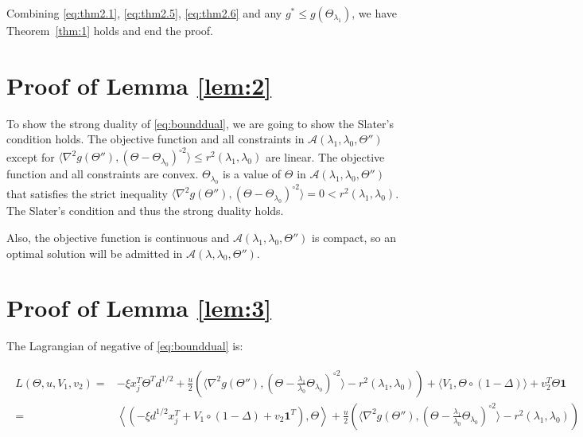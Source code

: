 Combining \eqref{eq:thm2.1}, \eqref{eq:thm2.5}, \eqref{eq:thm2.6} and any $g^*\leq g(\Theta_{\lambda_1})$, we have Theorem~\ref{thm:1} holds and end the proof.

\hspace{0 in}

\section{Proof of Lemma \ref{lem:2}}

To show the strong duality of \eqref{eq:bounddual}, we are going to show the Slater's condition holds. The objective function and all constraints in $\mathcal{A}(\lambda_1,{\lambda_0},\Theta'')$ except for $\langle\nabla^2 g(\Theta''),(\Theta-\Theta_{\lambda_0})^{\circ 2}\rangle\leq r^2(\lambda_1,\lambda_0)$ are linear. The objective function and all constraints are convex. $\Theta_{\lambda_0}$ is a value of $\Theta$ in $\mathcal{A}(\lambda_1,{\lambda_0},\Theta'')$ that satisfies the strict inequality $\langle\nabla^2 g(\Theta''),(\Theta-\Theta_{\lambda_0})^{\circ 2}\rangle=0< r^2(\lambda_1,\lambda_0)$. The Slater's condition and thus the strong duality holds.

Also, the objective function is continuous and $\mathcal{A}(\lambda_1,{\lambda_0},\Theta'')$ is compact, so an optimal solution will be admitted in $\mathcal{A}(\lambda,{\lambda_0},\Theta'')$.


\section{Proof of Lemma \ref{lem:3}}

The Lagrangian of negative of \eqref{eq:bounddual} is:

\begin{gather}
    \label{eq:lem4.1}
    \begin{aligned}
        L(\Theta,u,V_1,v_2)=&-\xi x_j^T\Theta^T d^{1/2}+\frac{u}{2}\left(\langle\nabla^2 g(\Theta''),(\Theta-\frac{\lambda_1}{\lambda_0}\Theta_{\lambda_0})^{\circ 2}\rangle-r^2(\lambda_1,\lambda_0)\right)
        +\langle V_1,\Theta\circ(1-\Delta)\rangle+v_2^T\Theta\mathbf{1}\\
        =&\left\langle\left(-\xi d^{1/2}x_j^T+V_1\circ(1-\Delta)+v_2\mathbf{1}^T\right),\Theta\right\rangle+\frac{u}{2}\left(\langle\nabla^2 g(\Theta''),(\Theta-\frac{\lambda_1}{\lambda_0}\Theta_{\lambda_0})^{\circ 2}\rangle-r^2(\lambda_1,\lambda_0)\right)
    \end{aligned}
\end{gather}

